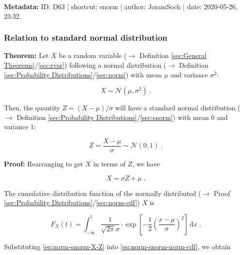 \documentclass[a4paper,12pt,twoside]{book}
\begin{document}
\vspace{1em}
\textbf{Metadata:} ID: D63 | shortcut: snorm | author: JoramSoch | date: 2020-05-26, 23:32.
\vspace{1em}



\subsubsection[\textbf{Relation to standard normal distribution}]{Relation to standard normal distribution} \label{sec:norm-snorm}
\setcounter{equation}{0}

\textbf{Theorem:} Let $X$ be a random variable ($\rightarrow$ Definition \ref{sec:General Theorems}/\ref{sec:rvar}) following a normal distribution ($\rightarrow$ Definition \ref{sec:Probability Distributions}/\ref{sec:norm}) with mean $\mu$ and variance $\sigma^2$:

\begin{equation} \label{eq:norm-snorm-X-norm}
X \sim \mathcal{N}(\mu, \sigma^2) \; .
\end{equation}

Then, the quantity $Z = (X-\mu)/\sigma$ will have a standard normal distribution ($\rightarrow$ Definition \ref{sec:Probability Distributions}/\ref{sec:snorm}) with mean $0$ and variance $1$:

\begin{equation} \label{eq:norm-snorm-Z-snorm}
Z = \frac{X-\mu}{\sigma} \sim \mathcal{N}(0, 1) \; .
\end{equation}


\vspace{1em}
\textbf{Proof:} Rearranging to get $X$ in terms of $Z$, we have

\begin{equation} \label{eq:norm-snorm-X-Z}
X = \sigma Z + \mu \; .
\end{equation}

The cumulative distribution function of the normally distributed ($\rightarrow$ Proof \ref{sec:Probability Distributions}/\ref{sec:norm-cdf}) $X$ is

\begin{equation} \label{eq:norm-snorm-norm-cdf}
F_X(t) = \int_{-\infty}^{t} \frac{1}{\sqrt{2 \pi} \sigma} \cdot \exp \left[ -\frac{1}{2} \left( \frac{x-\mu}{\sigma} \right)^2 \right] \, \mathrm{d}x \; .
\end{equation}

Substituting \eqref{eq:norm-snorm-X-Z} into \eqref{eq:norm-snorm-norm-cdf}, we obtain
\end{document}
